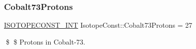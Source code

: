 \subsubsection{\texorpdfstring{Cobalt73\+Protons}{Cobalt73Protons}}
{\footnotesize\ttfamily \mbox{\hyperlink{group___isotope_const-_macros_ga5f18360b3e99483a35c32d789e62621c}{I\+S\+O\+T\+O\+P\+E\+C\+O\+N\+S\+T\+\_\+\+I\+NT}} Isotope\+Const\+::\+Cobalt73\+Protons = 27}

\$ \$ Protons in Cobalt-\/73. 